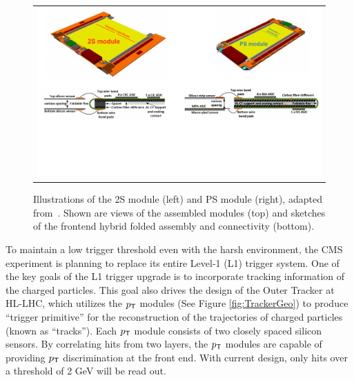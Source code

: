 \begin{figure}[tbh!]
 \begin{center}
  \begin{tabular}{c}
   \centering\includegraphics[width=0.95\linewidth]{figures/Part2/Upgrade/Modules}
  \end{tabular}
  \caption{Illustrations of the 2S module (left) and PS module (right), adapted from~\cite{CMS:2017lum}. Shown are views of the assembled modules (top) and  sketches of the frontend hybrid folded assembly and connectivity (bottom).}
 \label{fig:Modules}
 \end{center}
\end{figure}

To maintain a low trigger threshold even with the harsh environment, the CMS experiment is planning to replace its entire Level-1 (L1) trigger system. One of the key goals of the L1 trigger upgrade is to incorporate tracking information of the charged particles. This goal also drives the design of the Outer Tracker at \ac{HL-LHC}, which utilizes the $p_{\textsf{T}}$ modules (See Figure \ref{fig:TrackerGeo}) to produce ``trigger primitive'' for the reconstruction of the trajectories of charged particles (known as ``tracks''). Each $p_{\textsf{T}}$ module consists of two closely spaced silicon sensors. By correlating hits from two layers, the $p_{\textsf{T}}$ modules are capable of providing $p_{\textsf{T}}$ discrimination at the front end. With current design, only hits over a threshold of 2 GeV will be read out. 

